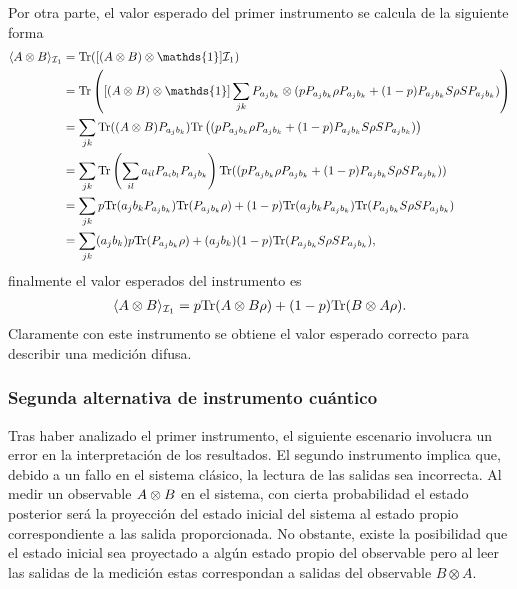Por otra parte, el valor esperado del primer instrumento se calcula de la siguiente forma \begin{equation*}
    \begin{split}
        \la A\otimes B \ra_{\mathcal{I}_1}&=\tr([(A\otimes B) \otimes \mathds{1}]\mathcal{I}_1) \\
        &=\tr\left([(A\otimes B) \otimes \mathds{1}]\sum_{jk}P_{a_j b_k}\otimes (pP_{a_j b_k}\rho P_{a_j b_k}+ (1-p)P_{a_j b_k}S\rho S P_{a_j b_k})\right)\\
        &=\sum_{jk} \tr((A\otimes B) P_{a_j b_k}) \tr\left((pP_{a_j b_k}\rho P_{a_j b_k}+ (1-p)P_{a_j b_k}S\rho S P_{a_j b_k})\right) \\
        &=\sum_{jk} \tr\left(\sum_{il}a_{il}P_{a_i b_l} P_{a_j b_k}\right) \tr((pP_{a_j b_k}\rho P_{a_j b_k}+ (1-p)P_{a_j b_k}S\rho S P_{a_j b_k})) \\
        &=\sum_{jk} p\tr(a_{j}b_k P_{a_j b_k}) \tr(P_{a_j b_k}\rho)+ (1-p)\tr(a_{j}b_k P_{a_j b_k})\tr(P_{a_j b_k}S\rho S P_{a_j b_k}) \\
        &=\sum_{jk}  (a_{j}b_k)p  \tr(P_{a_j b_k}\rho)+(a_{j}b_k) (1-p) \tr(P_{a_j b_k}S\rho S P_{a_j b_k}),\\
    \end{split}
\end{equation*}  finalmente el valor esperados del instrumento es \begin{equation}\label{eq:expectedValueFirstInstrument2p}
    \begin{split}
        \langle A\otimes B \rangle_{\mathcal{I}_1}&=p {\rm Tr}(A\otimes B \rho)+ (1-p){\rm Tr}(B\otimes A \rho ). \\
    \end{split}
\end{equation} Claramente con este instrumento se obtiene el valor esperado correcto para describir una medición difusa.


\subsubsection{Segunda alternativa de instrumento cuántico} %



Tras haber analizado el primer instrumento, el siguiente escenario involucra un error en la interpretación de los resultados. El segundo instrumento implica que, debido a un fallo en el sistema clásico, la lectura de las salidas sea incorrecta. Al medir un observable ${A \otimes B}$ en el sistema, con cierta probabilidad el estado posterior será la proyección del estado inicial del sistema al estado propio correspondiente a las salida proporcionada. No obstante, existe la posibilidad que el estado inicial sea proyectado a algún estado propio del observable pero al leer las salidas de la medición estas correspondan a salidas del observable $B\otimes A$.

